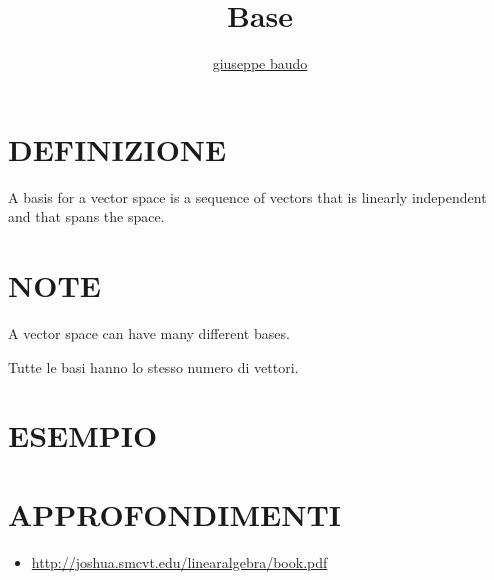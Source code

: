 \documentclass[a4paper,10pt]{article}
\title{Base}
\author{\href{http://www.baudo.hol.es}{giuseppe baudo}}
\begin{document}
\maketitle

\section{DEFINIZIONE}
A basis for a vector space is a sequence of vectors that is linearly independent and that spans the space.

\section{NOTE}
A vector space can have many different bases.

Tutte le basi hanno lo stesso numero di vettori.

\section{ESEMPIO}

\section{APPROFONDIMENTI}
\begin{itemize}
 \item \url{http://joshua.smcvt.edu/linearalgebra/book.pdf}
\end{itemize}
\end{document}
